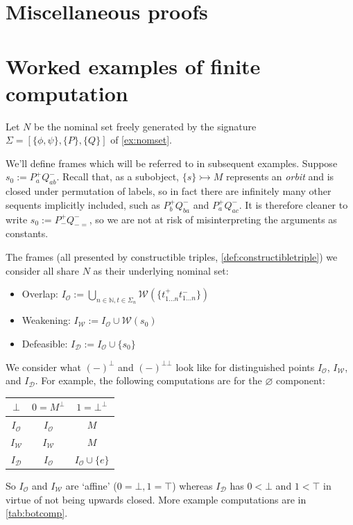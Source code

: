 \documentclass{article}
\newcommand{\allproofs}{} %
\theoremstyle{definition}
\newcommand{\N}{\mathbb{N}}
\newcommand{\cD}{\mathcal{D}}
\newcommand{\cO}{\mathcal{O}}
\newcommand{\cW}{\mathcal{W}}
\begin{document}
\section{Miscellaneous proofs}
\allproofs
\fi


\section{Worked examples of finite computation}
\label{sec:ex}

Let $N$ be the nominal set freely generated by the signature $\Sigma=[\{\phi,\psi\},\{P\},\{Q\}]$ of \cref{ex:nomset}.

We'll define frames which will be referred to in subsequent examples. Suppose $s_0:=P^+_aQ^-_{ab}$. Recall that, as a subobject, $\{s\} \rightarrowtail M$ represents an {\it orbit} and is closed under permutation of labels, so in fact there are infinitely many other sequents implicitly included, such as $P^+_bQ^-_{ba}$ and $P^+_aQ^-_{ac}$. It is therefore cleaner to write $s_0:=P^+_{-}Q^-_{-=}$, so we are not at risk of misinterpreting the arguments as constants. 

The frames (all presented by constructible triples, \cref{def:constructibletriple}) we consider all share $N$ as their underlying nominal set: 
\begin{itemize}
    \item Overlap: $I_\cO:=\bigcup_{n \in \N, t \in \Sigma_n} \cW(\{t^+_{1...n}t^-_{1...n}\})$
    \item Weakening: $I_\cW:= I_\cO \cup \cW(s_0)$
    \item Defeasible: $I_\cD :=I_\cO\cup \{s_0\}$
\end{itemize}


We consider what $(-)^{\bot}$ and $(-)^{\bot \bot}$ look like for distinguished points $I_\cO$, $I_\cW$, and $I_\cD $. For example, the following computations are for the $\varnothing$ component: 
   
\vspace{2mm}

\begin{minipage}{.25\textwidth} 
\centering 
\hspace{-5mm}
\begin{tabular}{||c||c|c||}
\hline\hline $\bot$    & $0=M^{\bot}$                    & $1=\bot^{\bot}$   \\
\hline $I_\cO$      & $I_\cO$        & $M$  \\
\hline $I_\cW$      & $I_\cW$        & $M$  \\
\hline $I_\cD $      & $I_\cO$        & $I_\cO \cup \{e\}$  \\
\hline\hline
\end{tabular}
\end{minipage}
\hspace{5mm}
\begin{minipage}{.65\textwidth} 

So $I_\cO$ and $I_\cW$ are `affine' ($0=\bot, 1 = \top$) whereas $I_\cD $ has $0 < \bot$ and $1 < \top$ in virtue of not being upwards closed. More example computations are in \cref{tab:botcomp}.
\end{minipage}
\end{document}
